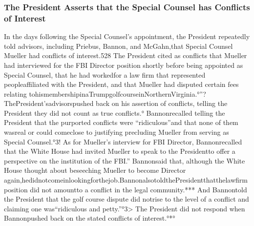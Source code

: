 {\subsubsection{The President Asserts that the Special Counsel has Conflicts of Interest}

In the days following the Special Counsel’s appointment, the President repeatedly told advisors, including Priebus, Bannon, and McGahn,that Special Counsel Mueller had conflicts of interest.528
The President cited as conflicts that Mueller had interviewed for the FBI Director position shortly before being appointed as Special Counsel, that he had workedfor a law firm that represented peopleaffiliated with the President, and that Mueller had disputed certain fees relating tohismembershipinaTrumpgolfcourseinNorthernVirginia.°”?
ThePresident’sadvisorspushed back on his assertion of conflicts, telling the President they did not count as true conflicts.°
Bannonrecalled telling the President that the purported conflicts were “ridiculous”and that none of them wasreal or could comeclose to justifying precluding Mueller from serving as Special Counsel.°3!
As for Mueller’s interview for FBI Director, Bannonrecalled that the White House had invited Mueller to speak to the Presidentto offer a perspective on the institution of the FBI.”
Bannonsaid that, although the White House thought about beseeching Mueller to become Director again,hedidnotcomeinlookingforthejob.BannonalsotoldthePresidentthatthelawfirm position did not amountto a conflict in the legal community.***
And Bannontold the President that the golf course dispute did notrise to the level of a conflict and claiming one was“ridiculous and petty.”°3>
The President did not respond when Bannonpushed back on the stated conflicts of interest.°*°

}
